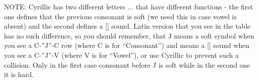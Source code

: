 NOTE: Cyrillic has two different letters ... that have different functions - the first one defines that the previous consonant is soft (we need this in case vowel is absent) and the second defines a [\textctj] sound. Latin version that you see in the table has no such difference, so you should remember, that J means a soft symbol when you see a C-”J”-C row (where C is for “Consonant”) and means a [\textctj] sound when you see a C-”J”-V (where V is for “Vowel”), or use Cyrillic to prevent such a collision. Only in the first case consonant before J is soft while in the second one it is hard.
